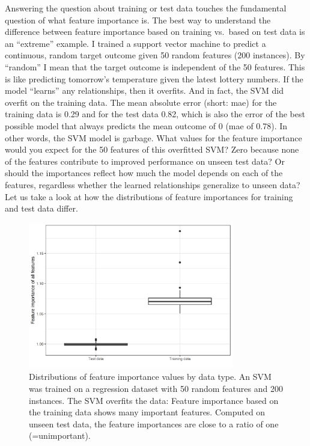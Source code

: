 \documentclass[
  11pt,
]{scrbook}
\begin{document}
Answering the question about training or test data touches the fundamental question of what feature importance is.
The best way to understand the difference between feature importance based on training vs.~based on test data is an ``extreme'' example.
I trained a support vector machine to predict a continuous, random target outcome given 50 random features (200 instances).
By ``random'' I mean that the target outcome is independent of the 50 features.
This is like predicting tomorrow's temperature given the latest lottery numbers.
If the model ``learns'' any relationships, then it overfits.
And in fact, the SVM did overfit on the training data.
The mean absolute error (short: mae) for the training data is 0.29 and for the test data 0.82, which is also the error of the best possible model that always predicts the mean outcome of 0 (mae of 0.78).
In other words, the SVM model is garbage.
What values for the feature importance would you expect for the 50 features of this overfitted SVM?
Zero because none of the features contribute to improved performance on unseen test data?
Or should the importances reflect how much the model depends on each of the features, regardless whether the learned relationships generalize to unseen data?
Let us take a look at how the distributions of feature importances for training and test data differ.

\begin{figure}

{\centering \includegraphics[width=0.8\textwidth]{images/feature-imp-sim-1} 

}

\caption{Distributions of feature importance values by data type. An SVM was trained on a regression dataset with 50 random features and 200 instances. The SVM overfits the data: Feature importance based on the training data shows many important features. Computed on unseen test data, the feature importances are close to a ratio of one (=unimportant).}\label{fig:feature-imp-sim}
\end{figure}
\end{document}

